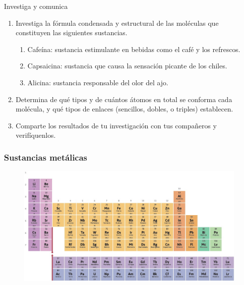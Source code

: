 \documentclass[11pt]{book}
\begin{document}
\begin{minipage}{\textwidth}
  \begin{boxK}
    Investiga y comunica
    \begin{enumerate}
      \item Investiga la fórmula condensada y estructural de las moléculas que constituyen las siguientes sustancias.
            \begin{enumerate}
              \item Cafeína: sustancia estimulante en bebidas como el café y los refrescos.
              \item Capsaicina: sustancia que causa la sensación picante de los chiles.
              \item Alicina: sustancia responsable del olor del ajo.
            \end{enumerate}
      \item Determina de qué tipos y de cuántos átomos en total se conforma cada molécula, y qué tipos de enlaces
            (sencillos, dobles, o triples) establecen.
      \item Comparte los resultados de tu investigación con tus compañeros y verifíquenlos.
    \end{enumerate}
  \end{boxK}
\end{minipage}


\subsubsection{Sustancias metálicas}

\begin{figure}[H]
  \centering
  \includegraphics[width=\textwidth]{metales.jpg}
  \label{fig:metales}
\end{figure}
\end{document}
